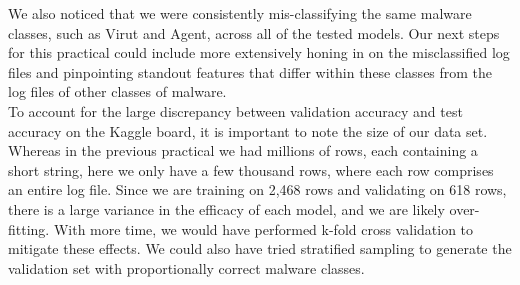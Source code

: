 \documentclass[11pt]{article}
\begin{document}
We also noticed that we were consistently mis-classifying the same malware classes, such as Virut and Agent, across all of the tested models. Our next steps for this practical could include more extensively honing in on the misclassified log files and pinpointing standout features that differ within these classes from the log files of other classes of malware. \\

To account for the large discrepancy between validation accuracy and test accuracy on the Kaggle board, it is important to note the size of our data set. Whereas in the previous practical we had millions of rows, each containing a short string, here we only have a few thousand rows, where each row comprises an entire log file. Since we are training on 2,468 rows and validating on 618 rows, there is a large variance in the efficacy of each model, and we are likely over-fitting. With more time, we would have performed k-fold cross validation to mitigate these effects. We could also have tried stratified sampling to generate the validation set with proportionally correct malware classes.\\
\end{document}
